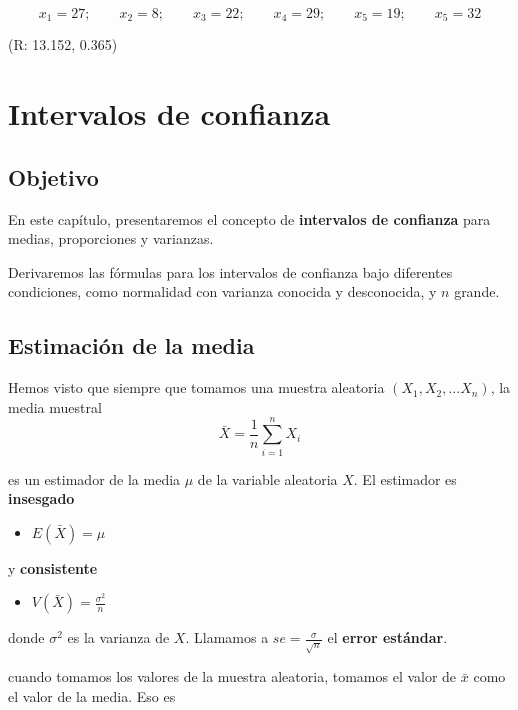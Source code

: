 \documentclass[
]{book}
\providecommand{\tightlist}{%
  \setlength{\itemsep}{0pt}\setlength{\parskip}{0pt}}
\begin{document}
\[x_1 = 27; \qquad   x_2 = 8; \qquad   x_3 = 22; \qquad   x_4 = 29; \qquad   x_5 = 19; \qquad   x_5 = 32\]

(R: 13.152, 0.365)

\hypertarget{intervalos-de-confianza}{%
\chapter{Intervalos de confianza}\label{intervalos-de-confianza}}

\hypertarget{objetivo-9}{%
\section{Objetivo}\label{objetivo-9}}

En este capítulo, presentaremos el concepto de \textbf{intervalos de confianza} para medias, proporciones y varianzas.

Derivaremos las fórmulas para los intervalos de confianza bajo diferentes condiciones, como normalidad con varianza conocida y desconocida, y \(n\) grande.

\hypertarget{estimaciuxf3n-de-la-media}{%
\section{Estimación de la media}\label{estimaciuxf3n-de-la-media}}

Hemos visto que siempre que tomamos una muestra aleatoria \((X_1, X_2, ... X_n)\), la media muestral
\[\bar{X}=\frac{1}{n}\sum_{i=1}^n X_i\]

es un estimador de la media \(\mu\) de la variable aleatoria \(X\). El estimador es \textbf{insesgado}

\begin{itemize}
\tightlist
\item
  \(E(\bar{X})=\mu\)
\end{itemize}

y \textbf{consistente}

\begin{itemize}
\tightlist
\item
  \(V(\bar{X})=\frac{\sigma^2}{n}\)
\end{itemize}

donde \(\sigma^2\) es la varianza de \(X\). Llamamos a \(se=\frac{\sigma}{\sqrt{n}}\) el \textbf{error estándar}.

cuando tomamos los valores de la muestra aleatoria, tomamos el valor de \(\bar{x}\) como el valor de la media. Eso es
\end{document}
